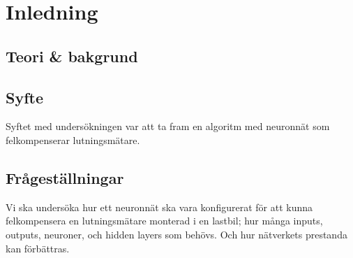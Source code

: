 \section{Inledning}

\subsection{Teori \& bakgrund}

\subsection{Syfte}
Syftet med  undersökningen var att ta fram en algoritm med neuronnät som
felkompenserar lutningsmätare.

\subsection{Frågeställningar}
Vi ska undersöka hur ett neuronnät ska vara konfigurerat för att kunna
felkompensera en lutningsmätare monterad i en lastbil; hur många inputs,
outputs, neuroner, och hidden layers som behövs.
Och hur nätverkets prestanda kan förbättras.
